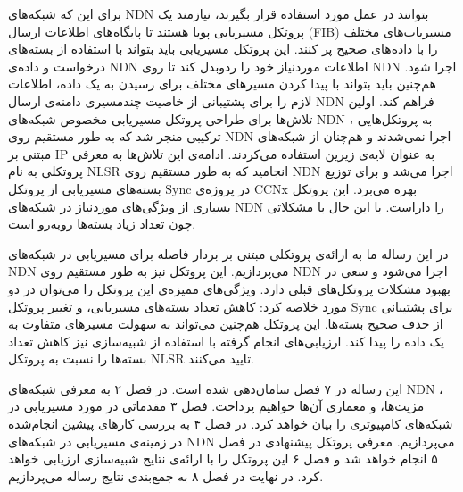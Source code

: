 برای این که شبکه‌های NDN بتوانند در عمل مورد استفاده قرار بگیرند، نیازمند یک پروتکل مسیریابی پویا هستند تا پایگاه‌های اطلاعات ارسال (FIB) مسیریاب‌های مختلف را با داده‌های صحیح پر کنند. این پروتکل مسیریابی باید بتواند با استفاده از بسته‌های درخواست و داده‌ی NDN اطلاعات موردنیاز خود را ردوبدل کند تا روی NDN اجرا شود. هم‌چنین باید بتواند با پیدا کردن مسیرهای مختلف برای رسیدن به یک داده، اطلاعات لازم را برای پشتیبانی از خاصیت چندمسیری دامنه‌ی ارسال NDN فراهم کند. اولین تلاش‌ها برای طراحی پروتکل مسیریابی مخصوص شبکه‌های NDN ، به پروتکل‌هایی ترکیبی منجر شد که به طور مستقیم روی NDN اجرا نمی‌شدند و هم‌چنان از شبکه‌های مبتنی بر IP به عنوان لایه‌ی زیرین استفاده می‌کردند. ادامه‌ی این تلاش‌ها به معرفی پروتکلی به نام NLSR انجامید که به طور مستقیم روی NDN اجرا می‌شد و برای توزیع بسته‌های مسیریابی از پروتکل Sync در پروژه‌ی CCNx 
\cite{ccnx}
بهره می‌برد. این پروتکل بسیاری از ویژگی‌های موردنیاز در شبکه‌های NDN را داراست. با این حال با مشکلاتی چون تعداد زیاد بسته‌ها روبه‌رو است.

در این رساله ما به ارائه‌ی پروتکلی مبتنی بر بردار فاصله برای مسیریابی در شبکه‌های NDN می‌پردازیم. این پروتکل نیز به طور مستقیم روی NDN اجرا می‌شود و سعی در بهبود مشکلات پروتکل‌های قبلی دارد. ویژگی‌های ممیزه‌ی این پروتکل را می‌توان در دو مورد خلاصه کرد: کاهش تعداد بسته‌های مسیریابی، و تغییر پروتکل Sync برای پشتیبانی از حذف صحیح بسته‌ها. این پروتکل هم‌چنین می‌تواند به سهولت مسیرهای متفاوت به یک داده را پیدا کند. ارزیابی‌های انجام گرفته با استفاده از شبیه‌سازی نیز کاهش تعداد بسته‌ها را نسبت به پروتکل NLSR تایید می‌کنند. 

این رساله در ۷ فصل سامان‌دهی شده است. در فصل ۲ به معرفی شبکه‌های NDN ، مزیت‌ها، و معماری آن‌ها خواهیم پرداخت. فصل ۳ مقدماتی در مورد مسیریابی در شبکه‌های کامپیوتری را بیان خواهد کرد. در فصل ۴ به بررسی کارهای پیشین انجام‌شده در زمینه‌ی مسیریابی در شبکه‌های NDN می‌پردازیم. معرفی پروتکل پیشنهادی در فصل ۵ انجام خواهد شد و فصل ۶ این پروتکل را با ارائه‌ی نتایج شبیه‌سازی ارزیابی خواهد کرد. در نهایت در فصل ۸ به جمع‌بندی نتایج رساله می‌پردازیم. 